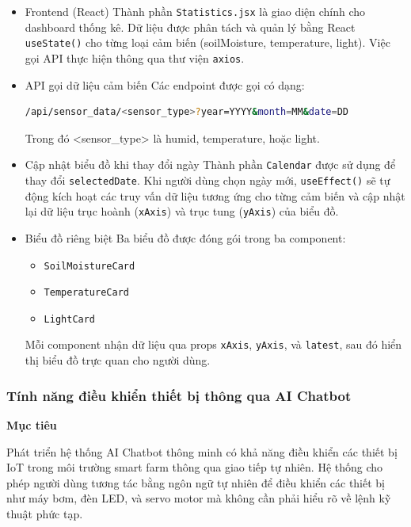 \begin{itemize}
    \item Frontend (React) \newline
    Thành phần \texttt{Statistics.jsx} là giao diện chính cho dashboard thống kê. Dữ liệu được phân tách và quản lý bằng React \texttt{useState()} cho từng loại cảm biến (soilMoisture, temperature, light). Việc gọi API thực hiện thông qua thư viện \texttt{axios}.

    \item API gọi dữ liệu cảm biến \newline
    Các endpoint được gọi có dạng:
    \begin{lstlisting}[language=bash]
/api/sensor_data/<sensor_type>?year=YYYY&month=MM&date=DD
    \end{lstlisting}
    Trong đó <sensor\_type> là humid, temperature, hoặc light.

    \item Cập nhật biểu đồ khi thay đổi ngày \newline
    Thành phần \texttt{Calendar} được sử dụng để thay đổi \texttt{selectedDate}. Khi người dùng chọn ngày mới, \texttt{useEffect()} sẽ tự động kích hoạt các truy vấn dữ liệu tương ứng cho từng cảm biến và cập nhật lại dữ liệu trục hoành (\texttt{xAxis}) và trục tung (\texttt{yAxis}) của biểu đồ.
    \item Biểu đồ riêng biệt
    Ba biểu đồ được đóng gói trong ba component:
    \begin{itemize}
        \item \texttt{SoilMoistureCard}
        \item \texttt{TemperatureCard}
        \item \texttt{LightCard}
    \end{itemize}
    Mỗi component nhận dữ liệu qua props \texttt{xAxis}, \texttt{yAxis}, và \texttt{latest}, sau đó hiển thị biểu đồ trực quan cho người dùng.
\end{itemize}
    
\subsubsection{Tính năng điều khiển thiết bị thông qua AI Chatbot}

\textbf{Mục tiêu}

Phát triển hệ thống AI Chatbot thông minh có khả năng điều khiển các thiết bị IoT trong môi trường smart farm thông qua giao tiếp tự nhiên. Hệ thống cho phép người dùng tương tác bằng ngôn ngữ tự nhiên để điều khiển các thiết bị như máy bơm, đèn LED, và servo motor mà không cần phải hiểu rõ về lệnh kỹ thuật phức tạp.

